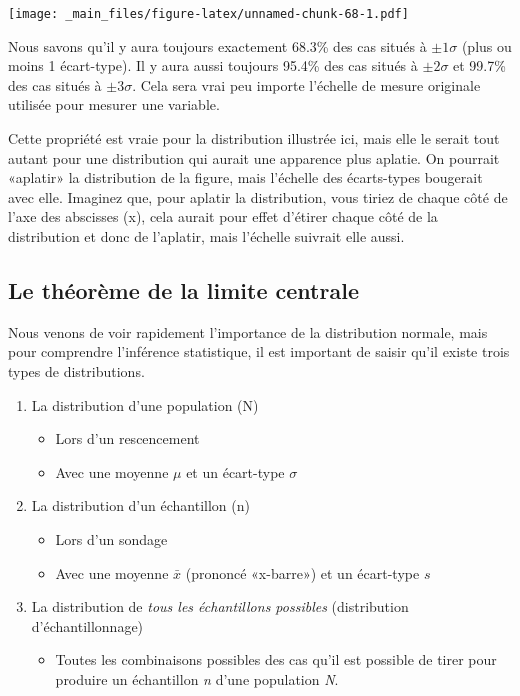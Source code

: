 \documentclass[
]{book}
\providecommand{\tightlist}{%
  \setlength{\itemsep}{0pt}\setlength{\parskip}{0pt}}
\begin{document}
\texttt{[image: \_main\_files/figure-latex/unnamed-chunk-68-1.pdf]}

Nous savons qu'il y aura toujours exactement 68.3\% des cas situés à \(\pm 1\sigma\) (plus ou moins 1 écart-type). Il y aura aussi toujours 95.4\% des cas situés à \(\pm 2\sigma\) et 99.7\% des cas situés à \(\pm3\sigma\). Cela sera vrai peu importe l'échelle de mesure originale utilisée pour mesurer une variable.

Cette propriété est vraie pour la distribution illustrée ici, mais elle le serait tout autant pour une distribution qui aurait une apparence plus aplatie. On pourrait «aplatir» la distribution de la figure, mais l'échelle des écarts-types bougerait avec elle. Imaginez que, pour aplatir la distribution, vous tiriez de chaque côté de l'axe des abscisses (x), cela aurait pour effet d'étirer chaque côté de la distribution et donc de l'aplatir, mais l'échelle suivrait elle aussi.

\hypertarget{le-thuxe9oruxe8me-de-la-limite-centrale}{%
\subsection{Le théorème de la limite centrale}\label{le-thuxe9oruxe8me-de-la-limite-centrale}}

Nous venons de voir rapidement l'importance de la distribution normale, mais pour comprendre l'inférence statistique, il est important de saisir qu'il existe trois types de distributions.

\begin{enumerate}
\def\labelenumi{\arabic{enumi}.}
\tightlist
\item
  La distribution d'une population (N)

  \begin{itemize}
  \tightlist
  \item
    Lors d'un rescencement
  \item
    Avec une moyenne \(\mu\) et un écart-type \(\sigma\)
  \end{itemize}
\item
  La distribution d'un échantillon (n)

  \begin{itemize}
  \tightlist
  \item
    Lors d'un sondage
  \item
    Avec une moyenne \(\bar{x}\) (prononcé «x-barre») et un écart-type \(s\)
  \end{itemize}
\item
  La distribution de \emph{tous les échantillons possibles} (distribution d'échantillonnage)

  \begin{itemize}
  \tightlist
  \item
    Toutes les combinaisons possibles des cas qu'il est possible de tirer pour produire un échantillon \emph{n} d'une population \emph{N}.
  \end{itemize}
\end{enumerate}
\end{document}

